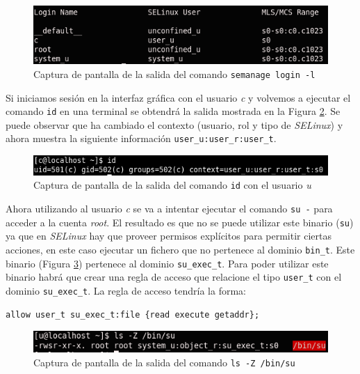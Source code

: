 \documentclass[10pt,a4paper]{article}
\begin{document}
\begin{figure}[h!]
\centering
\includegraphics[scale=0.5]{images/parte2_8.png}
\caption{Captura de pantalla de la salida del comando \texttt{semanage login -l}}
\label{fig:parte2_8}
\end{figure}

Si iniciamos sesión en la interfaz gráfica con el usuario \emph{c} y volvemos a ejecutar el comando \texttt{id} en una terminal se obtendrá la salida mostrada en la Figura \ref{fig:parte2_10}. Se puede observar que ha cambiado el contexto (usuario, rol y tipo de \emph{SELinux}) y ahora muestra la siguiente información \texttt{user\_{}u:user\_{}r:user\_{}t}.\\

\begin{figure}[h!]
\centering
\includegraphics[scale=0.7]{images/parte2_10.png}
\caption{Captura de pantalla de la salida del comando \texttt{id} con el usuario \emph{u}}
\label{fig:parte2_10}
\end{figure}

Ahora utilizando al usuario \emph{c} se va a intentar ejecutar el comando \texttt{su -} para acceder a la cuenta \emph{root}. El resultado es que no se puede utilizar este binario (\texttt{su}) ya que en \emph{SELinux} hay que proveer permisos explícitos para permitir ciertas acciones, en este caso ejecutar un fichero que no pertenece al dominio \texttt{bin\_{}t}. Este binario (Figura \ref{fig:parte2_11}) pertenece al dominio \texttt{su\_{}exec\_{}t}. Para poder utilizar este binario habrá que crear una regla de acceso que relacione el tipo \texttt{user\_{}t} con el dominio \texttt{su\_{}exec\_{}t}. La regla de acceso tendría la forma:

\begin{lstlisting}
allow user_t su_exec_t:file {read execute getaddr};
\end{lstlisting}

\begin{figure}[h!]
\centering
\includegraphics[scale=0.7]{images/parte2_11.png}
\caption{Captura de pantalla de la salida del comando \texttt{ls -Z /bin/su}}
\label{fig:parte2_11}
\end{figure}
\end{document}
